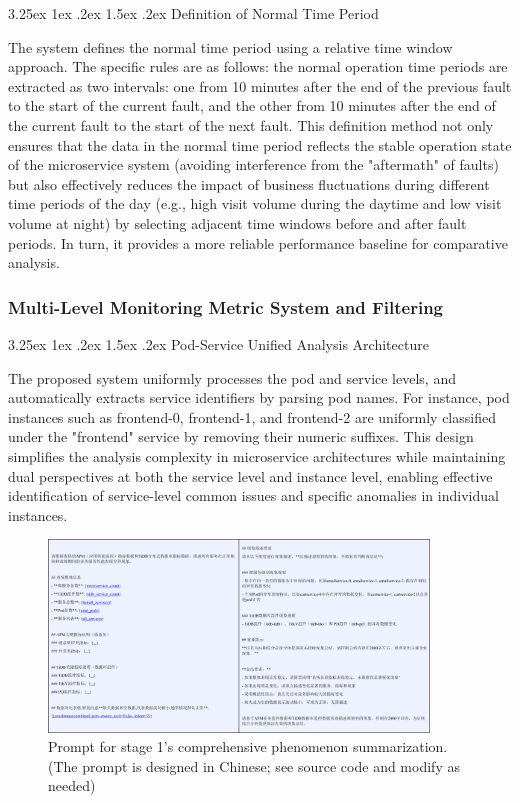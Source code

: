 \documentclass[10pt]{article}
\makeatletter
\renewcommand{\paragraph}{%
    \@startsection{paragraph}{4}{\z@}%
    {3.25ex \@plus1ex \@minus.2ex}%
    {1.5ex \@plus.2ex}%
    {\normalfont\normalsize\itshape}%
}
\makeatother
\begin{document}
\paragraph{Definition of Normal Time Period}

The system defines the normal time period using a relative time window approach. The specific rules are as follows: the normal operation time periods are extracted as two intervals: one from 10 minutes after the end of the previous fault to the start of the current fault, and the other from 10 minutes after the end of the current fault to the start of the next fault. This definition method not only ensures that the data in the normal time period reflects the stable operation state of the microservice system (avoiding interference from the "aftermath" of faults) but also effectively reduces the impact of business fluctuations during different time periods of the day (e.g., high visit volume during the daytime and low visit volume at night) by selecting adjacent time windows before and after fault periods. In turn, it provides a more reliable performance baseline for comparative analysis.

\subsubsection{Multi-Level Monitoring Metric System and Filtering}

\paragraph{Pod-Service Unified Analysis Architecture}

The proposed system uniformly processes the pod and service levels, and automatically extracts service identifiers by parsing pod names. For instance, pod instances such as frontend-0, frontend-1, and frontend-2 are uniformly classified under the "frontend" service by removing their numeric suffixes. This design simplifies the analysis complexity in microservice architectures while maintaining dual perspectives at both the service level and instance level, enabling effective identification of service-level common issues and specific anomalies in individual instances.

\begin{figure}[htbp]
    \centering
    \includegraphics[width=0.9\textwidth]{pics/fig13.png}
    \caption{Prompt for stage 1's comprehensive phenomenon summarization. (The prompt is designed in Chinese; see source code and modify as needed)}
    \label{fig13}
\end{figure}
\end{document}
